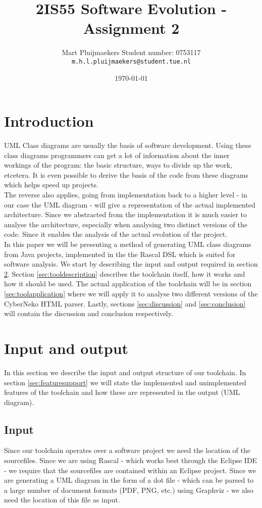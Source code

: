 \documentclass[a4paper,twoside,11pt]{article}
\title{\sffamily\bfseries 2IS55 Software Evolution - Assignment 2}
\author{Mart Pluijmaekers \qquad Student number: 0753117 \\{\tt m.h.l.pluijmaekers@student.tue.nl}}
\date{\today}
\begin{document}
\maketitle
\tableofcontents
\newpage


\section{Introduction}
UML Class diagrams are usually the basis of software development. Using these class diagrams programmers can get a lot of information about the inner workings of the program: the basic structure, ways to divide up the work, etcetera. It is even possible to derive the basis of the code from these diagrams which helps speed up projects. \\

The reverse also applies, going from implementation back to a higher level - in our case the UML diagram - will give a representation of the actual implemented architecture. Since we abstracted from the implementation it is much easier to analyse the architecture, especially when analysing two distinct versions of the code. Since it enables the analysis of the actual evolution of the project. \\

In this paper we will be presenting a method of generating UML class diagrams from Java projects, implemented in the the Rascal\cite{url:rascal} DSL which is suited for software analysis.  We start by describing the input and output required in section \ref{sec:inputoutput}. Section \ref{sec:tooldescription} describes the toolchain itself, how it works and how it should be used. The actual application of the toolchain will be in section \ref{sec:toolapplication} where we will apply it to analyse two different versions of the CyberNeko HTML parser\cite{url:cyberneko}. Lastly,  sections  \ref{sec:discussion} and  \ref{sec:conclusion} will contain the discussion and conclusion respectively.


\section{Input and output}
\label{sec:inputoutput}
In this section we describe the input and output structure of our toolchain. In section \ref{sec:featuresupport} we will state the implemented and unimplemented features of the toolchain and how these are represented in the output (UML diagram).

\subsection{Input}
\label{sec:input}
Since our toolchain operates over a software project we need the location of the sourcefiles. Since we are using Rascal - which works best through the Eclipse IDE\cite{url:eclipse} - we require that the sourcefiles are contained within an Eclipse project. Since we are generating a UML diagram in the form of a dot file - which can be parsed to a large number of document formats (PDF, PNG, etc.) using Graphviz\cite{url:graphviz} - we also need the location of this file as input.
\end{document}
